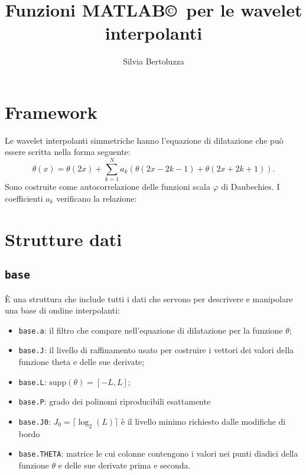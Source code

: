 \documentclass{amsart}
\theoremstyle{definition}
\theoremstyle{remark}
\numberwithin{equation}{section}
\begin{document}
\title{Funzioni MATLAB\copyright\ per le wavelet interpolanti}%
\author{Silvia Bertoluzza}%
%

\maketitle
\section{Framework}

Le wavelet interpolanti simmetriche hanno l'equazione di dilatazione che pu\`o essere scritta nella forma seguente:
\[ \theta(x) = \theta(2x) + \sum_{k=1}^N a_k (\theta(2x - 2k - 1) + \theta(2x + 2k + 1) ). \]
Sono costruite come autocorrelazione delle funzioni scala $\varphi$ di Daubechies. I coefficienti $a_k$ verificano la relazione:

\section{Strutture dati}

\subsection*{\tt base} \`E una struttura che include tutti i dati che servono per descrivere e manipolare una base di ondine interpolanti:

\begin{itemize}
  \item {\tt base.a}: il filtro che compare nell'equazione di dilatazione per la funzione $\theta$;
  \item {\tt base.J}: il livello di raffinamento usato per costruire i vettori dei valori della funzione theta e delle sue derivate;
  \item {\tt base.L}: $\textrm{supp}(\theta)=[-L,L]$;
  \item {\tt base.P}: grado dei polinomi riproducibili esattamente
  \item {\tt base.J0}: $J_0 = \lceil \log_2(L)\rceil$ \`e il livello minimo richiesto dalle modifiche di bordo
  \item {\tt base.THETA}: matrice le cui colonne contengono i valori nei punti diadici della funzione $\theta$ e delle sue derivate prima e seconda.
\end{itemize}
\end{document}
